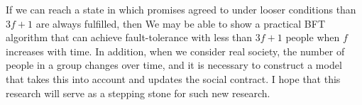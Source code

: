 If we can reach a state in which promises agreed to under looser conditions than $3f+1$ are always fulfilled, 
then We may be able to show a practical BFT algorithm that can achieve fault-tolerance 
with less than $3f+1$ people when $f$ increases with time.
In addition, when we consider real society, the number of people in a group changes over time, and it is necessary to construct a model that takes this into account and updates the social contract.
I hope that this research will serve as a stepping stone for such new research.
~ \\

